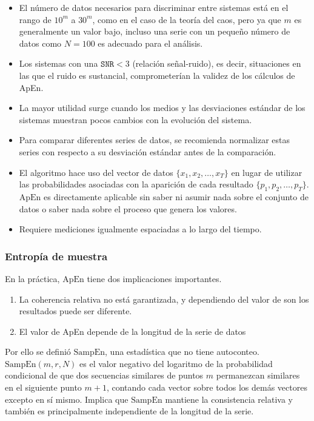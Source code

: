\documentclass[a4paper,12pt]{article}
\begin{document}
\begin{itemize}[noitemsep, topsep=2pt]
	\item El número de datos necesarios para discriminar entre sistemas está en el rango de $10^m$ a $30^m$, como en el caso de la teoría del caos, pero ya que $m$ es generalmente un valor bajo, incluso una serie con un pequeño número de datos como $N = 100$ es adecuado para el análisis.
	\item Los sistemas con una $\texttt{SNR}<3$ (relación señal-ruido), es decir, situaciones en las que el ruido es sustancial, comprometerían la validez de los cálculos de ApEn.
	\item La mayor utilidad surge cuando los medios y las desviaciones estándar de los sistemas muestran pocos cambios con la evolución del sistema.
	\item Para comparar diferentes series de datos, se recomienda normalizar estas series con respecto a su desviación estándar antes de la comparación.
	\item El algoritmo hace uso del vector de datos $\{x_1, x_2, \dots, x_T\}$ en lugar de utilizar las probabilidades asociadas con la aparición de cada resultado $\{p_1, p_2, \dots, p_T\}$. $\textrm{ApEn}$ es directamente aplicable sin saber ni asumir nada sobre el conjunto de datos o saber nada sobre el proceso que genera los valores. 
	\item Requiere mediciones igualmente espaciadas a lo largo del tiempo. 
\end{itemize}

\subsubsection{Entropía de muestra }
En la práctica, $\textrm{ApEn}$ tiene dos implicaciones importantes. 
\begin{enumerate}[noitemsep, topsep=2pt]
	\item La coherencia relativa no está garantizada, y dependiendo del valor de son los resultados puede ser diferente.
	\item El valor de ApEn depende de la longitud de la serie de datos
\end{enumerate}

Por ello se definió $\textrm{SampEn}$, una estadística que no tiene autoconteo. $\textrm{SampEn}(m, r, N)$ es el valor negativo del logaritmo de la probabilidad condicional de que dos secuencias similares de puntos $m$ permanezcan similares en el siguiente punto $m+1$, contando cada vector sobre todos los demás vectores excepto en sí mismo. Implica que $\textrm{SampEn}$ mantiene la consistencia relativa y también es principalmente independiente de la longitud de la serie.
\end{document}
